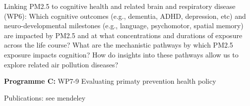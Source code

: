 Linking PM2.5 to cognitive health and related brain and respiratory disease (WP6): Which cognitive outcomes (e.g., dementia, ADHD, depression, etc) and neuro-developmental milestones (e.g., language, psychomotor, spatial memory) are impacted by PM2.5 and at what concentrations and durations of exposure across the life course? What are the mechanistic pathways by which PM2.5 exposure impacts cognition? How do insights into these pathways allow us to explore related air pollution diseases?

\textbf{Programme C:}
WP7-9 Evaluating primaty prevention health policy

Publications:
see mendeley
